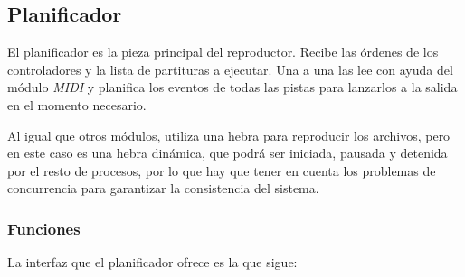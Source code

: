 \smallskip

\subsection{Planificador}
\label{subsec:planificador}

El planificador es la pieza principal del reproductor. Recibe las órdenes de los controladores y la lista de partituras a ejecutar. Una a una las lee con ayuda del módulo \textit{MIDI} y planifica los eventos de todas las pistas para lanzarlos a la salida en el momento necesario.

Al igual que otros módulos, utiliza una hebra para reproducir los archivos, pero en este caso es una hebra dinámica, que podrá ser iniciada, pausada y detenida por el resto de procesos, por lo que hay que tener en cuenta los problemas de concurrencia para garantizar la consistencia del sistema.

\subsubsection{Funciones}

La interfaz que el planificador ofrece es la que sigue:

